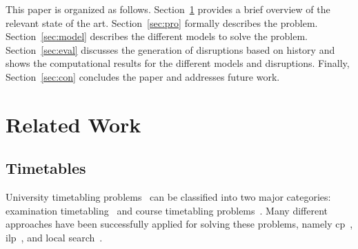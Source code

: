 \documentclass[runningheads]{llncs}
\begin{document}

This paper is organized as follows. Section~\ref{sec:rel} provides a brief overview of the relevant state of the art. Section~\ref{sec:pro} formally describes the problem. Section~\ref{sec:model} describes the different models to solve the problem.  Section~\ref{sec:eval}  discusses the generation of disruptions based on history and shows the computational results for the different models and disruptions. Finally, Section~\ref{sec:con} concludes the paper and addresses future work.
\vspace{-.3cm}

\section{Related Work}\label{sec:rel}
\subsection{Timetables}
University timetabling problems~\cite{di2007second,DBLP:conf/wea/LachL08,DBLP:conf/patat/MullerRB04,DBLP:journals/eor/VermuytenLMB16}  can be classified into two major categories: examination timetabling~\cite{M2009} and course timetabling problems~\cite{di2007second}. Many different approaches have been successfully applied for solving these problems, namely  \gls{cp}~\cite{DBLP:conf/patat/MullerRB04}, \gls{ilp}~\cite{LINDAHL2019,DBLP:journals/eor/VermuytenLMB16}, and local search~\cite{DBLP:conf/patat/grasp}. 
\end{document}
